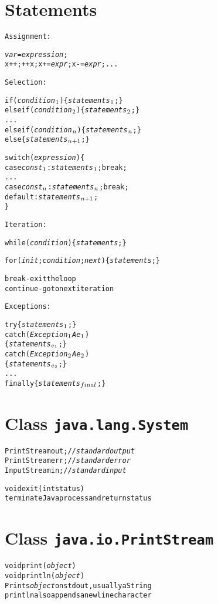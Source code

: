 \documentclass[twocolumn,12pt]{article}
\begin{document}
\section*{Statements}
\begin{alltt}
\textrm{Assignment:}

\emph{var} = \emph{expression};
x++;  ++x;  x+=\emph{expr};  x-=\emph{expr}; ...

\textrm{Selection:}

if (\emph{condition\(\sb{1}\)}) \{ \emph{statements\(\sb{1}\)}; \}
else if (\emph{condition\(\sb{2}\)}) \{ \emph{statements\(\sb{2}\)}; \}
...
else if (\emph{condition\(\sb{n}\)}) \{ \emph{statements\(\sb{n}\)}; \}
else \{ \emph{statements\(\sb{n+1}\)}; \}

switch (\emph{expression}) \{
case \emph{const\(\sb{1}\)}: \emph{statements\(\sb{1}\)}; break;
...
case \emph{const\(\sb{n}\)}: \emph{statements\(\sb{n}\)}; break;
default: \emph{statements\(\sb{n+1}\)};
\}

\textrm{Iteration:}

while (\emph{condition}) \{ \emph{statements}; \}

for (\emph{init};\emph{condition};\emph{next}) \{ \emph{statements}; \}

break - \textrm{exit the loop}
continue - \textrm{go to next iteration}

\textrm{Exceptions:}

try \{ \emph{statements\(\sb{1}\)}; \}
catch (\emph{Exception\(\sb{1}\)A} \emph{e\(\sb{1}\)})
   \{ \emph{statements\(\sb{e\sb{1}}\)}; \}
catch (\emph{Exception\(\sb{2}\)A} \emph{e\(\sb{2}\)})
   \{ \emph{statements\(\sb{e\sb{2}}\)}; \}
...
finally \{ \emph{statements\(\sb{final}\)}; \}
\end{alltt}

\section*{Class \texttt{java.lang.System}}
\begin{alltt}
PrintStream out;  // \emph{standard output}
PrintStream err;  // \emph{standard error}
InputStream in;   // \emph{standard input}

void exit(int status)
   \textrm{terminate Java process and return} status
\end{alltt}

\section*{Class \texttt{java.io.PrintStream}}
\begin{alltt}
void print(\emph{object})
void println(\emph{object})
   \textrm{Prints \emph{object} on} stdout\textrm{, usually a} String
   println \textrm{also appends a newline character}
\end{alltt}
\end{document}
